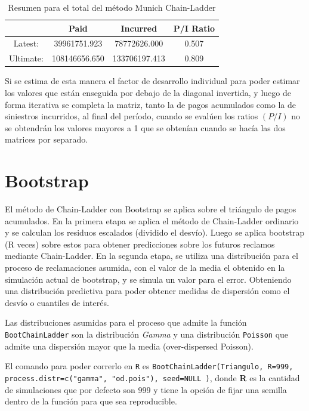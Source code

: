 \documentclass[
  12pt,
]{article}
\begin{document}
\begin{table}[ht]
\centering
\caption{Resumen para el total del método Munich Chain-Ladder} 
\label{totales}
\begin{tabular}{cccc}
  \hline
 & Paid & Incurred & P/I Ratio \\ 
  \hline
Latest: & 39961751.923 & 78772626.000 & 0.507 \\ 
  Ultimate: & 108146656.650 & 133706197.413 & 0.809 \\ 
   \hline
\end{tabular}
\end{table}

Si se estima de esta manera el factor de desarrollo individual para
poder estimar los valores que están enseguida por debajo de la diagonal
invertida, y luego de forma iterativa se completa la matriz, tanto la de
pagos acumulados como la de siniestros incurridos, al final del período,
cuando se evalúen los ratios \((P/I)\) no se obtendrán los valores
mayores a 1 que se obtenían cuando se hacía las dos matrices por
separado.

\hypertarget{bootstrap}{%
\section{Bootstrap}\label{bootstrap}}

El método de Chain-Ladder con Bootstrap se aplica sobre el triángulo de
pagos acumulados. En la primera etapa se aplica el método de
Chain-Ladder ordinario y se calculan los residuos escalados (dividido el
desvío). Luego se aplica bootstrap (R veces) sobre estos para obtener
predicciones sobre los futuros reclamos mediante Chain-Ladder. En la
segunda etapa, se utiliza una distribución para el proceso de
reclamaciones asumida, con el valor de la media el obtenido en la
simulación actual de bootstrap, y se simula un valor para el error.
Obteniendo una distribución predictiva para poder obtener medidas de
dispersión como el desvío o cuantiles de interés.

Las distribuciones asumidas para el proceso que admite la función
\texttt{BootChainLadder} son la distribución \textit{Gamma} y una
distribución \texttt{Poisson} que admite una dispersión mayor que la
media (over-dispersed Poisson).

El comando para poder correrlo en \texttt{R} es
\texttt{BootChainLadder(Triangulo, R=999, process.distr=c("gamma", "od.pois"), seed=NULL )},
donde \textbf{R} es la cantidad de simulaciones que por defecto son 999
y tiene la opción de fijar una semilla dentro de la función para que sea
reproducible.
\end{document}
